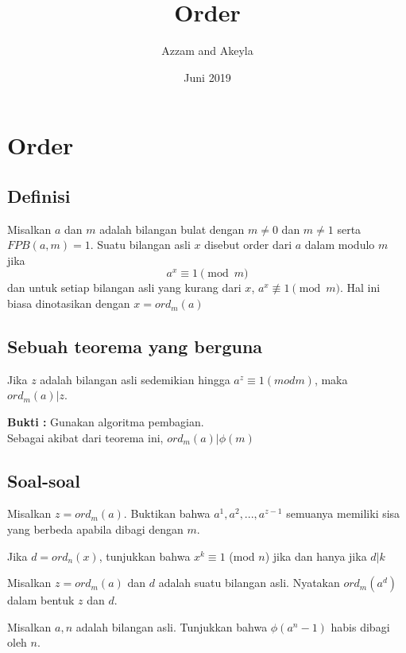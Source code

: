 \documentclass[11pt]{scrartcl}
\title{Order}
\date{Juni 2019}
\author{Azzam and Akeyla}
\begin{document}
\maketitle

\renewcommand*\contentsname{Daftar Isi}
\tableofcontents

\newpage
\section{Order}
\subsection{Definisi}
Misalkan $a$ dan $m$ adalah bilangan bulat dengan $m \neq 0$ dan $m \neq 1$ serta $FPB(a,m) = 1$. Suatu bilangan asli $x$ disebut order dari $a$ dalam modulo $m$ jika $$a^x \equiv 1 \pmod{m}$$ dan untuk setiap bilangan asli yang kurang dari $x$, $a^x \not\equiv 1 \pmod{m}$. Hal ini biasa dinotasikan dengan $x = ord_m(a)$
\subsection{Sebuah teorema yang berguna}
\begin{theorem}
    Jika $z$ adalah bilangan asli sedemikian hingga $a^z \equiv 1 (mod m)$, maka $ord_m(a) | z$.
\end{theorem}
\textbf{Bukti :} Gunakan algoritma pembagian.\\
Sebagai akibat dari teorema ini, $ord_m(a) | \phi(m)$
\subsection{Soal-soal}
\begin{problem}
    Misalkan $z = ord_m(a)$. Buktikan bahwa $a^1, a^2, ..., a^{z - 1}$ semuanya memiliki sisa yang berbeda apabila dibagi dengan $m$.
\end{problem}

\begin{problem}
    Jika $d = ord_n(x)$, tunjukkan bahwa $x^k \equiv 1$ (mod $n$) jika dan hanya jika $d|k$
\end{problem}

\begin{problem}
    Misalkan $z = ord_m(a)$ dan $d$ adalah suatu bilangan asli. Nyatakan $ord_m(a^d)$ dalam bentuk $z$ dan $d$.
\end{problem}

\begin{problem}
    Misalkan $a,n$ adalah bilangan asli. Tunjukkan bahwa $\phi(a^n - 1)$ habis dibagi oleh $n$.
\end{problem}
\end{document}
